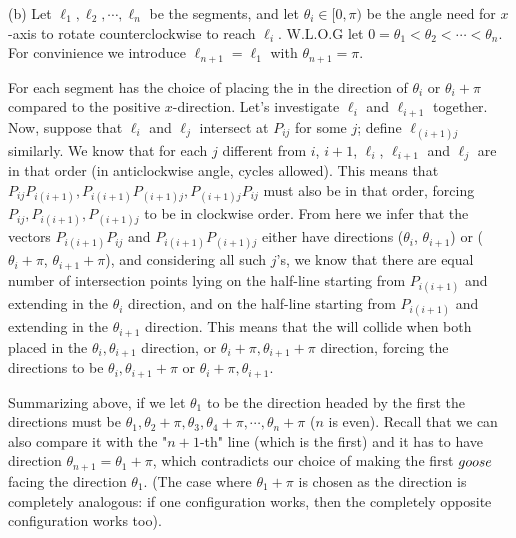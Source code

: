 \documentclass[11pt,a4paper]{article}
\begin{document}
\begin{itemize}
(b) Let $\ell_1, \ell_2, \cdots , \ell_n$ be the segments, and let $\theta_i\in [0, \pi)$ be the angle need for $x$-axis to rotate counterclockwise to reach $\ell_i$. 
W.L.O.G let $0=\theta_1 < \theta_2< \cdots < \theta_n$. For convinience we introduce $\ell_{n+1}=\ell_1$ with $\theta_{n+1}=\pi$. 

For each segment \person has the choice of placing the \animal in the direction of $\theta_i$ or $\theta_i +\pi$ compared to the positive $x$-direction. Let's investigate $\ell_i$ and $\ell_{i+1}$ together. 
Now, suppose that $\ell_i$ and $\ell_j$ intersect at $P_{ij}$ for some $j$; define $\ell_{(i+1)j}$ similarly. 
We know that for each $j$ different from $i$, $i+1$, $\ell_i$, $\ell_{i+1}$ and $\ell_j$ are in that order (in anticlockwise angle, cycles allowed). 
This means that $P_{ij}P_{i(i+1)}, P_{i(i+1)}P_{(i+1)j}, P_{(i+1)j}P_{ij}$ must also be in that order, 
forcing $P_{ij}, P_{i(i+1)}, P_{(i+1)j}$ to be in clockwise order. 
From here we infer that the vectors $P_{i(i+1)}P_{ij}$ and $P_{i(i+1)}P_{(i+1)j}$ either have directions ($\theta_i$, $\theta_{i+1}$) or ($\theta_i +\pi$, $\theta_{i+1} +\pi$), 
and considering all such $j$'s, we know that there are equal number of intersection points lying on the half-line starting from $P_{i(i+1)}$ and extending in the $\theta_i$ direction, and on the half-line starting from $P_{i(i+1)}$ and extending in the $\theta_{i+1}$ direction. 
This means that the \animals will collide when both placed in the $\theta_i, \theta_{i+1}$ direction, or $\theta_i +\pi, \theta_{i+1}+\pi$ direction, 
forcing the directions to be  $\theta_i, \theta_{i+1}+\pi$ or  $\theta_i +\pi, \theta_{i+1}$. 

Summarizing above, if we let $\theta_1$ to be the direction headed by the first \animal
the directions must be $\theta_1, \theta_2+\pi, \theta_3, \theta_4+\pi, \cdots , \theta_n+\pi$ ($n$ is even). 
Recall that we can also compare it with the "$n+1$-th" line (which is the first) and it has to have direction $\theta_{n+1}=\theta_1 +\pi$, 
which contradicts our choice of making the first $goose$ facing the direction $\theta_1$. 
(The case where $\theta_1+\pi$ is chosen as the direction is completely analogous: if one configuration works, then the completely opposite configuration works too). 
\end{itemize}

\newpage
\end{document}
